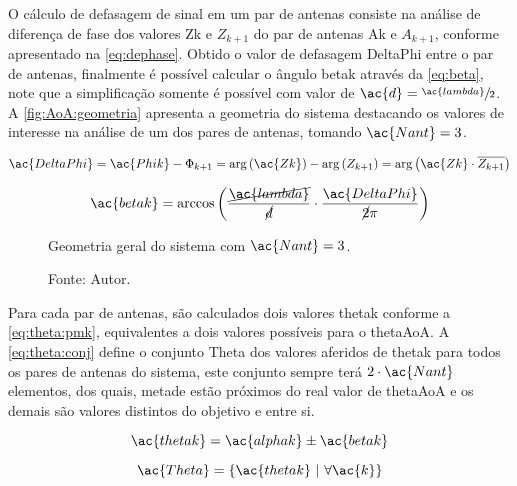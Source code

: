 
O cálculo de defasagem de sinal em um par de antenas consiste na análise de diferença de fase dos valores \ac{Zk} e $Z_{k+1}$ do par de antenas \ac{Ak} e $A_{k+1}$, conforme apresentado na \autoref{eq:dephase}.
Obtido o valor de defasagem \ac{DeltaPhi} entre o par de antenas, finalmente é possível calcular o ângulo \ac{betak} através da \autoref{eq:beta}, note que a simplificação somente é possível com valor de $\ac{d} = \sfrac{\ac{lambda}}{2}$.
A \autoref{fig:AoA:geometria} apresenta a geometria do sistema destacando os valores de interesse na análise de um dos pares de antenas, tomando $\ac{Nant} = 3$.

\begin{equation} \label{eq:dephase}
    \ac{DeltaPhi} =
    \ac{Phik} - \Phi_{k+1} =
    \arg\left(\ac{Zk}\right) - \arg\left(Z_{k+1}\right) =
    \arg\left(\ac{Zk} \cdot \overline{Z_{k+1}}\right)
\end{equation}

\begin{equation} \label{eq:beta}
    \ac{betak} = \arccos\left(\frac{\cancel{\ac{lambda}}}{\cancel{d}}\cdot\frac{\ac{DeltaPhi}}{\cancel{2}\pi}\right)
\end{equation}

\begin{figure}[htbp]
    \centering
    \caption{Geometria geral do sistema com $\ac{Nant} = 3$.}
    
    \label{fig:AoA:geometria}
    \caption*{Fonte: Autor.}
\end{figure}

Para cada par de antenas, são calculados dois valores \ac{thetak} conforme a \autoref{eq:theta:pmk}, equivalentes a dois valores possíveis para o \ac{thetaAoA}.
A \autoref{eq:theta:conj} define o conjunto \ac{Theta} dos valores aferidos de \ac{thetak} para todos os pares de antenas do sistema, este conjunto sempre terá $2 \cdot \ac{Nant}$ elementos, dos quais, metade estão próximos do real valor de \ac{thetaAoA} e os demais são valores distintos do objetivo e entre si.

\begin{equation} \label{eq:theta:pmk}
	\ac{thetak} = \ac{alphak}\pm \ac{betak}
\end{equation}

\begin{equation} \label{eq:theta:conj}
	\ac{Theta} = \left\{\ac{thetak} ~\middle\vert~ \forall \ac{k}\right\}
\end{equation}


